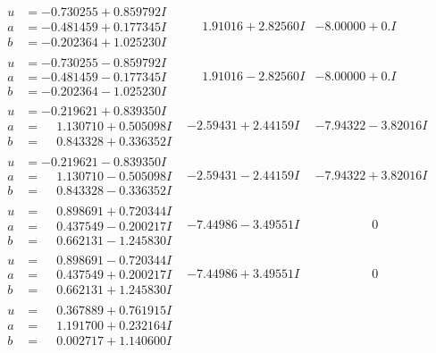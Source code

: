 \documentclass[1p]{elsarticle_modified}
\theoremstyle{definition}
\begin{document}
$$\begin{array}{c|c|c}
\begin{aligned}
u &= -0.730255 + 0.859792 I \\
a &= -0.481459 + 0.177345 I \\
b &= -0.202364 + 1.025230 I\end{aligned}
 & \phantom{-}1.91016 + 2.82560 I & -8.00000 + 0. I\phantom{ +0.000000I} \\ \hline\begin{aligned}
u &= -0.730255 - 0.859792 I \\
a &= -0.481459 - 0.177345 I \\
b &= -0.202364 - 1.025230 I\end{aligned}
 & \phantom{-}1.91016 - 2.82560 I & -8.00000 + 0. I\phantom{ +0.000000I} \\ \hline\begin{aligned}
u &= -0.219621 + 0.839350 I \\
a &= \phantom{-}1.130710 + 0.505098 I \\
b &= \phantom{-}0.843328 + 0.336352 I\end{aligned}
 & -2.59431 + 2.44159 I & -7.94322 - 3.82016 I \\ \hline\begin{aligned}
u &= -0.219621 - 0.839350 I \\
a &= \phantom{-}1.130710 - 0.505098 I \\
b &= \phantom{-}0.843328 - 0.336352 I\end{aligned}
 & -2.59431 - 2.44159 I & -7.94322 + 3.82016 I \\ \hline\begin{aligned}
u &= \phantom{-}0.898691 + 0.720344 I \\
a &= \phantom{-}0.437549 - 0.200217 I \\
b &= \phantom{-}0.662131 - 1.245830 I\end{aligned}
 & -7.44986 - 3.49551 I & \phantom{-0.000000 } 0 \\ \hline\begin{aligned}
u &= \phantom{-}0.898691 - 0.720344 I \\
a &= \phantom{-}0.437549 + 0.200217 I \\
b &= \phantom{-}0.662131 + 1.245830 I\end{aligned}
 & -7.44986 + 3.49551 I & \phantom{-0.000000 } 0 \\ \hline\begin{aligned}
u &= \phantom{-}0.367889 + 0.761915 I \\
a &= \phantom{-}1.191700 + 0.232164 I \\
b &= \phantom{-}0.002717 + 1.140600 I\end{aligned}

\end{array}$$
\end{document}
